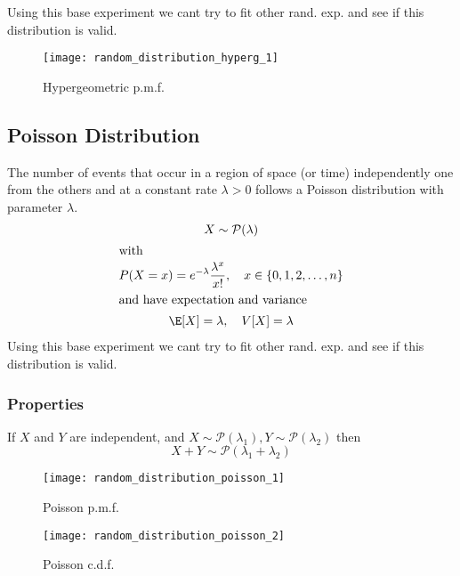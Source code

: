 Using this base
experiment we cant try to fit other rand. exp. and see if this distribution is
valid.
\begin{figure}[!ht]
    \begin{center}
        \texttt{[image: random\_distribution\_hyperg\_1]}
        \caption{Hypergeometric p.m.f.}
        \label{fig:hyp_geom_pmf}
    \end{center}
\end{figure}

\subsection{Poisson Distribution} %
\label{sub:poisson_distribution}

The number of events that occur in a region of space (or time) independently one
from the others and at a constant rate $\lambda >0$ follows a Poisson
distribution with parameter $\lambda$.
\begin{gather*}
    X \sim \mathcal{P}(\lambda)\\
    \intertext{with}
    P(X=x) = e^{-\lambda}\dfrac{\lambda^x}{x!}, \quad x \in \{0,1,2,\dots,n\}\\
    \intertext{and have expectation and variance}
    \E[X] = \lambda, \quad V[X] = \lambda
\end{gather*} Using this 
base experiment we cant try to fit other rand. exp. and see if this distribution 
is valid.

\subsubsection{Properties} %
\label{ssub:properties07}

If $X$ and $Y$ are independent, and $X \sim \mathcal{P}(\lambda_1), Y \sim
\mathcal{P}(\lambda_2)$ then 
\begin{equation*}
    X+Y \sim \mathcal{P}(\lambda_1+\lambda_2)
\end{equation*}

\begin{figure}[!ht]
    \begin{minipage}{0.45\linewidth}
      \texttt{[image: random\_distribution\_poisson\_1]}
      \caption{Poisson p.m.f.}
      \label{fig:psn_pmf}
    \end{minipage}
    \hfill
    \begin{minipage}{0.45\linewidth}
      \texttt{[image: random\_distribution\_poisson\_2]}
      \caption{Poisson c.d.f.}
      \label{fig:psn_cdf}
    \end{minipage}
\end{figure}

